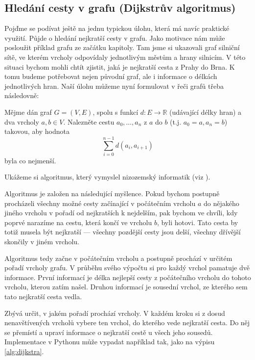 \subsection*{Hledání cesty v grafu (Dijkstrův algoritmus)}

Pojďme se podívat ještě na jednu typickou úlohu, která má navíc praktické využití. Půjde o hledání nejkratší cesty v grafu. Jako motivace nám může posloužit příklad
grafu ze začátku kapitoly. Tam jsme si ukazovali graf silniční sítě, ve kterém vrcholy odpovídaly jednotlivým městům a hrany silnicím. V této situaci bychom mohli chtít
zjistit, jaká je nejkratší cesta z Prahy do Brna. K tomu budeme potřebovat nejen
původní graf, ale i informace o délkách jednotlivých hran. Naší úlohu můžeme nyní
formulovat v řeči grafů třeba následovně:

\begin{question} Mějme dán graf $G=(V,E)$, spolu s funkcí $d:E\to\mathbb{R}$ (udávající
délky hran) a dva vrcholy $a,b\in V$. Nalezněte cestu $a_0,\ldots,a_n$ z $a$ do $b$ (t.j. $a_0=a, a_n=b$) takovou, aby hodnota
\begin{displaymath}
 \sum_{i=0}^{n-1} d(a_i,a_{i+1})
\end{displaymath}
byla co nejmenší.
\end{question}

Ukážeme si algoritmus, který vymyslel nizozemský informatik  (viz \cite{Dijkstra:59}).

Algoritmus je založen na následující myšlence. Pokud bychom postupně procházeli všechny možné cesty začínající v počátečním vrcholu
$a$ do nějakého jiného vrcholu v pořadí od nejkratších k nejdelším, pak bychom ve chvíli, kdy poprvé narazíme na cestu, která končí ve vrcholu $b$,
byli hotovi. Tato cesta by totiž musela být nejkratší --- všechny pozdější cesty jsou delší, všechny dřívější skončily v jiném vrcholu.

Algoritmus tedy začne v počátečním vrcholu a postupně prochází v určitém pořadí
vrcholy grafu. V průběhu svého výpočtu si pro každý vrchol pamatuje dvě informace.
První informací je délka nejlepší cesty z počátečního vrcholu do tohoto vrcholu,
kterou zatím našel. Druhou informací je sousední vrchol, ze kterého sem tato nejkratší cesta vedla.

Zbývá určit, v jakém pořadí prochází vrcholy. V každém kroku si z dosud nenavštívených vrcholů
vybere ten vrchol, do kterého vede nejkratší cesta. Do něj se přemístí a upraví informace
o nejkratší cestě u všech jeho sousedů. Implementace v Pythonu může vypadat například
tak, jako na výpisu \ref{alg:dijkstra}.

